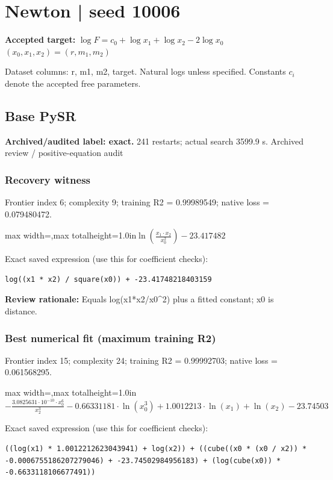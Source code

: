 \documentclass[10pt,letterpaper,landscape]{article}
\begin{document}
\section*{Newton | seed 10006}
\textbf{Accepted target:} $\displaystyle \log F=c_0+\log x_1+\log x_2-2\log x_0$\hfill $(x_0,x_1,x_2)=(r,m_1,m_2)$\par
{\small Dataset columns: r, m1, m2, target. Natural logs unless specified. Constants $c_i$ denote the accepted free parameters.}\par\medskip
\begin{minipage}[t]{0.485\textwidth}
\subsection*{Base PySR}
\textbf{Archived/audited label: exact.} 241 restarts; actual search 3599.9 s.
{\small Archived review / positive-equation audit}
\subsubsection*{Recovery witness}
Frontier index 6; complexity 9; training R2 = 0.99989549; native loss = 0.079480472.
\begin{center}\begin{adjustbox}{max width=\linewidth,max totalheight=1.0in}$\displaystyle \ln{\left(\frac{x_{1} \cdot x_{2}}{x_{0}^{2}} \right)} - 23.417482$\end{adjustbox}\end{center}
{\scriptsize Exact saved expression (use this for coefficient checks):}
\begin{lstlisting}
log((x1 * x2) / square(x0)) + -23.41748218403159
\end{lstlisting}
{\small\textbf{Review rationale:} Equals log(x1*x2/x0\textasciicircum{}2) plus a fitted constant; x0 is distance.}
\subsubsection*{Best numerical fit (maximum training R2)}
Frontier index 15; complexity 24; training R2 = 0.99992703; native loss = 0.061568295.
\begin{center}\begin{adjustbox}{max width=\linewidth,max totalheight=1.0in}$\displaystyle - \frac{3.0825631 \cdot 10^{-10} \cdot x_{0}^{6}}{x_{2}^{3}} - 0.66331181 \cdot \ln{\left(x_{0}^{3} \right)} + 1.0012213 \cdot \ln{\left(x_{1} \right)} + \ln{\left(x_{2} \right)} - 23.74503$\end{adjustbox}\end{center}
{\scriptsize Exact saved expression (use this for coefficient checks):}
\begin{lstlisting}
((log(x1) * 1.0012212623043941) + log(x2)) + ((cube((x0 * (x0 / x2)) * -0.0006755186207279046) + -23.74502984956183) + (log(cube(x0)) * -0.6633118106677491))
\end{lstlisting}
\end{minipage}\hfill
\end{document}
